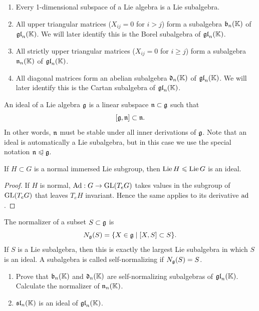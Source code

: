 \begin{example}
    \begin{enumerate}
        \item Every 1-dimensional subspace of a Lie algebra is a Lie subalgebra.
        \item All upper triangular matrices ($X_{ij}=0$ for $i>j$) form a subalgebra $\mathfrak{b}_n(\mathbb{K})$ of $\mathfrak{gl}_n(\mathbb{K})$. We will later identify this is the Borel subalgebra of $\mathfrak{gl}_n(\mathbb{K})$.
        \item All strictly upper triangular matrices ($X_{ij}=0$ for $i\geq j$) form a subalgebra $\mathfrak{n}_n(\mathbb{K})$ of $\mathfrak{gl}_n(\mathbb{K})$.
        \item All diagonal matrices form an abelian subalgebra $\mathfrak{d}_n(\mathbb{K})$ of $\mathfrak{gl}_n(\mathbb{K})$. We will later identify this is the Cartan subalgebra of $\mathfrak{gl}_n(\mathbb{K})$.
    \end{enumerate}
\end{example}



\begin{defn}[Ideal]
    An ideal of a Lie algebra $\mathfrak{g}$ is a linear subspace $\mathfrak{n}\subset\mathfrak{g}$ such that
    \[[\mathfrak{g},\mathfrak{n}]\subset \mathfrak{n}.\]
    In other words, $\mathfrak{n}$ must be stable under all inner derivations of $\mathfrak{g}$. Note that an ideal is automatically a Lie subalgebra, but in this case we use the special notation $\mathfrak{n}\trianglelefteqslant \mathfrak{g}$.
\end{defn}

\begin{prop}
    If $H\subset G$ is a normal immersed Lie subgroup, then $\operatorname{Lie} H\leqslant \operatorname{Lie} G$ is an ideal.
\end{prop}
\begin{proof}
    If $H$ is normal, $\mathrm{Ad}:G\to \operatorname{GL}(T_eG)$ takes values in the subgroup of $\operatorname{GL}(T_eG)$ that leaves $T_e H$ invariant. Hence the same applies to its derivative $\mathrm{ad}$.
\end{proof}

\begin{defn}
    The normalizer of a subset $S\subset \mathfrak{g}$ is
    \[N_{\mathfrak{g}}(S)=\{X\in\mathfrak{g}\mid [X,S]\subset S\}.\]
    If $S$ is a Lie subalgebra, then this is exactly the largest Lie subalgebra in which $S$ is an ideal. A subalgebra is called self-normalizing if $N_{\mathfrak{g}}(S)=S$.
\end{defn}

\begin{xca}
    \begin{enumerate}
         \item Prove that $\mathfrak{b}_n(\mathbb{K})$ and $\mathfrak{d}_n(\mathbb{K})$ are self-normalizing subalgebras of $\mathfrak{gl}_n(\mathbb{K})$. Calculate the normalizer of $\mathfrak{n}_n(\mathbb{K})$.
         \item $\mathfrak{sl}_n(\mathbb{K})$ is an ideal of $\mathfrak{gl}_n(\mathbb{K})$.
    \end{enumerate}
\end{xca}

